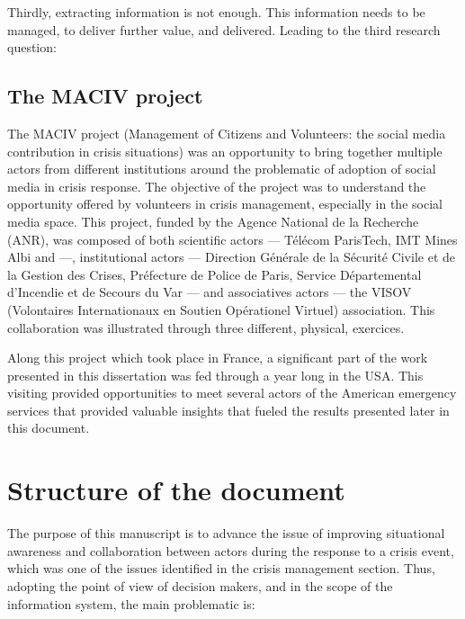 Thirdly, extracting information is not enough.
This information needs to be managed, to deliver further value, and delivered.
Leading to the third research question:

\begin{center}
\end{center}

\subsection{The MACIV project}
The MACIV project (Management of Citizens and Volunteers: the social media contribution in crisis situations)
was an opportunity to bring together multiple actors from different institutions around the problematic
of adoption of social media in crisis response.
The objective of the project was to understand the opportunity offered by volunteers in crisis management, especially in the social media space.
This project, funded by the Agence National de la Recherche (ANR), was composed of both
scientific actors — Télécom ParisTech, IMT Mines Albi and —,
institutional actors — Direction Générale de la Sécurité Civile et de la Gestion des Crises, Préfecture de Police de Paris, Service Départemental d'Incendie et de Secours du Var — and
associatives actors — the VISOV (Volontaires Internationaux en Soutien Opérationel Virtuel) association.
This collaboration was illustrated through three different, physical, exercices.

Along this project which took place in France, a significant part of the work presented in this dissertation was fed through a year long in the USA.
This visiting provided opportunities to meet several actors of the American  emergency services that
provided valuable insights that fueled the results presented later in this document.

\section{Structure of the document}
The purpose of this manuscript is to advance the issue of improving situational awareness and collaboration between actors during the response to a crisis event, which was one of the issues identified in the crisis management section.
Thus, adopting the point of view of decision makers, and in the scope of the information system, the main problematic is:

